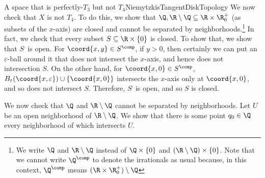 \begin{exm}{A space that is perfectly-$T_3$ but not $T_4$}{NiemytzkisTangentDiskTopology}
We now check that $X$ is not $T_4$.  To do this, we show that $\Q ,\R \setminus \Q \subseteq \R \times \R _0^+$ (as subsets of the $x$-axis) are closed and cannot be separated by neighborhoods.\footnote{We write $\Q$ and $\R \setminus \Q$ instead of $\Q \times \{ 0\}$ and $(\R \setminus \Q )\times \{ 0\}$.  Note that we cannot write $\Q ^{\comp}$ to denote the irrationals as usual because, in this context, $\Q ^{\comp}$ means $(\R \times \R _0^+)\setminus \Q$}  In fact, we check that every subset $S\subseteq \R \times \{ 0\}$ is closed.  To show that, we show that $S^{\comp}$ is open.  For $\coord{x,y}\in S^{\comp}$, if $y>0$, then certainly we can put an $\varepsilon$-ball around it that does not intersect the $x$-axis, and hence does not intersection $S$.  On the other hand, for $\coord{x,0}\in S^{\comp}$, $B_{\varepsilon}(\coord{x,\varepsilon})\cup \{ \coord{x,0}\}$ intersects the $x$-axis only at $\coord{x,0}$, and so does not intersect $S$.  Therefore, $S^{\comp}$ is open, and so $S$ is closed.

We now check that $\Q$ and $\R \setminus \Q$ cannot be separated by neighborhoods.  Let $U$ be an open neighborhood of $\R \setminus \Q$.  We show that there is some point $q_0\in \Q$ every neighborhood of which intersects $U$.


\end{exm}
